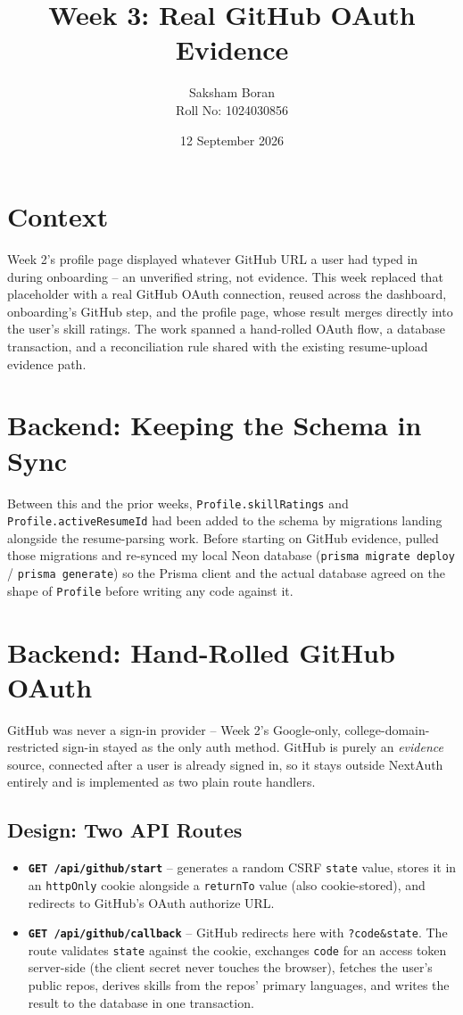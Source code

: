 \documentclass[11pt,a4paper]{article}
\title{\bfseries Week 3: Real GitHub OAuth Evidence}
\author{Saksham Boran \\ \small Roll No: 1024030856}
\date{12 September 2026}
\begin{document}
\maketitle

\section{Context}
Week 2's profile page displayed whatever GitHub URL a user had
typed in during onboarding -- an unverified string, not evidence.
This week replaced that placeholder with a real GitHub OAuth
connection, reused across the dashboard, onboarding's GitHub step,
and the profile page, whose result merges directly into the user's
skill ratings. The work spanned a hand-rolled OAuth flow, a
database transaction, and a reconciliation rule shared with the
existing resume-upload evidence path.

\section{Backend: Keeping the Schema in Sync}
Between this and the prior weeks, \texttt{Profile.skillRatings}
and \texttt{Profile.activeResumeId} had been added to the schema
by migrations landing alongside the resume-parsing work. Before
starting on GitHub evidence, pulled those migrations and
re-synced my local Neon database (\texttt{prisma migrate deploy} /
\texttt{prisma generate}) so the Prisma client and the actual
database agreed on the shape of \texttt{Profile} before writing
any code against it.

\section{Backend: Hand-Rolled GitHub OAuth}
GitHub was never a sign-in provider -- Week 2's Google-only,
college-domain-restricted sign-in stayed as the only auth method.
GitHub is purely an \emph{evidence} source, connected after a user
is already signed in, so it stays outside NextAuth entirely and is
implemented as two plain route handlers.

\subsection{Design: Two API Routes}
\begin{itemize}[leftmargin=0.7cm]
  \item \textbf{\texttt{GET /api/github/start}} -- generates a
    random CSRF \texttt{state} value, stores it in an
    \texttt{httpOnly} cookie alongside a \texttt{returnTo} value
    (also cookie-stored), and redirects to GitHub's OAuth
    authorize URL.
  \item \textbf{\texttt{GET /api/github/callback}} -- GitHub
    redirects here with \texttt{?code\&state}. The route validates
    \texttt{state} against the cookie, exchanges \texttt{code} for
    an access token server-side (the client secret never touches
    the browser), fetches the user's public repos, derives skills
    from the repos' primary languages, and writes the result to
    the database in one transaction.
\end{itemize}
\end{document}
